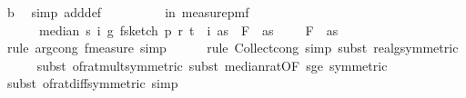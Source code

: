 \begin{isabellebody}
\ b\ \isamarkupfalse%
\ {\isacharparenleft}{\kern0pt}simp\ add{\isacharcolon}{\kern0pt}{\isasymOmega}def{\isacharparenright}{\kern0pt}\ \isanewline
\ \ \isamarkupfalse%
\ \isamarkupfalse%
\ {\isachardoublequoteopen}{\isachardot}{\kern0pt}{\isachardot}{\kern0pt}{\isachardot}{\kern0pt}\ {\isacharequal}{\kern0pt}\ {\isasymP}{\isacharparenleft}{\kern0pt}{\isasymomega}\ in\ measure{\isacharunderscore}{\kern0pt}pmf\ {\isasymOmega}\ \isanewline
\ \ \ \ \ \ {\isasymbar}median\ s\ {\isacharparenleft}{\kern0pt}{\isasymlambda}i{\isachardot}{\kern0pt}\ g\ {\isacharparenleft}{\kern0pt}f{}{\isacharunderscore}{\kern0pt}sketch\ p\ r\ t\ {\isacharparenleft}{\kern0pt}{\isasymomega}\ i{\isacharparenright}{\kern0pt}\ as{\isacharparenright}{\kern0pt}{\isacharparenright}{\kern0pt}\ {\isacharminus}{\kern0pt}\ F\ {}\ as{\isasymbar}\ {\isasymle}\ \ {\isasymdelta}\ {\isacharasterisk}{\kern0pt}\ F\ {}\ as{\isacharparenright}{\kern0pt}{\isachardoublequoteclose}\isanewline
\ \ \ \ \isamarkupfalse%
\ {\isacharparenleft}{\kern0pt}rule\ arg{\isacharunderscore}{\kern0pt}cong{}{\isacharbrackleft}{\kern0pt}\ f{\isacharequal}{\kern0pt}{\isachardoublequoteopen}measure{\isachardoublequoteclose}{\isacharbrackright}{\kern0pt}{\isacharcomma}{\kern0pt}\ simp{\isacharparenright}{\kern0pt}\isanewline
\ \ \ \ \isamarkupfalse%
\ {\isacharparenleft}{\kern0pt}rule\ Collect{\isacharunderscore}{\kern0pt}cong{\isacharcomma}{\kern0pt}\ simp{\isacharcomma}{\kern0pt}\ subst\ real{\isacharunderscore}{\kern0pt}g{\isacharbrackleft}{\kern0pt}symmetric{\isacharbrackright}{\kern0pt}{\isacharparenright}{\kern0pt}\isanewline
\ \ \ \ \isamarkupfalse%
\ {\isacharparenleft}{\kern0pt}subst\ of{\isacharunderscore}{\kern0pt}rat{\isacharunderscore}{\kern0pt}mult{\isacharbrackleft}{\kern0pt}symmetric{\isacharbrackright}{\kern0pt}{\isacharcomma}{\kern0pt}\ subst\ median{\isacharunderscore}{\kern0pt}rat{\isacharbrackleft}{\kern0pt}OF\ s{\isacharunderscore}{\kern0pt}ge{\isacharunderscore}{\kern0pt}{}{\isacharcomma}{\kern0pt}\ symmetric{\isacharbrackright}{\kern0pt}{\isacharparenright}{\kern0pt}\isanewline
\ \ \ \ \isamarkupfalse%
\ {\isacharparenleft}{\kern0pt}subst\ of{\isacharunderscore}{\kern0pt}rat{\isacharunderscore}{\kern0pt}diff{\isacharbrackleft}{\kern0pt}symmetric{\isacharbrackright}{\kern0pt}{\isacharcomma}{\kern0pt}\ simp{\isacharparenright}{\kern0pt}\isanewline

\end{isabellebody}
